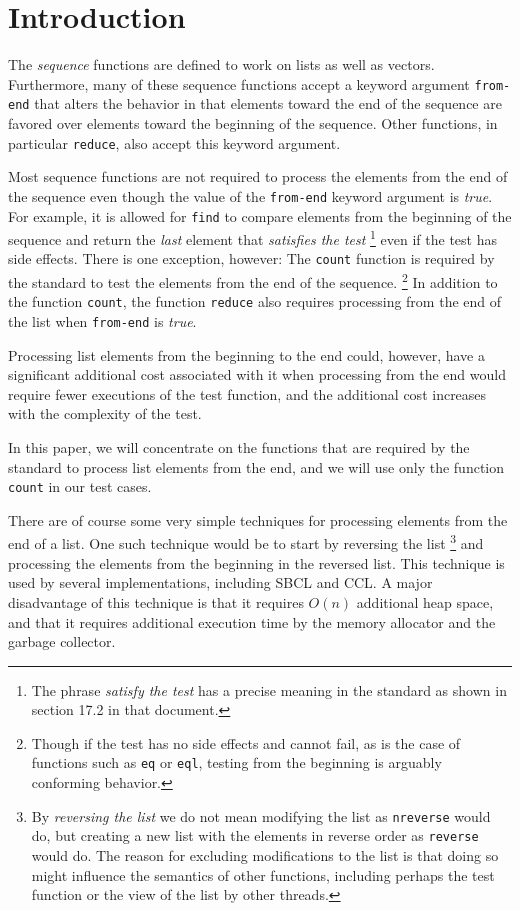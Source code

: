 \section{Introduction}

The \commonlisp{} \emph{sequence} functions are defined to work on
lists as well as vectors.  Furthermore, many of these sequence
functions accept a keyword argument \texttt{from-end} that alters the
behavior in that elements toward the end of the sequence are favored
over elements toward the beginning of the sequence.  Other functions,
in particular \texttt{reduce}, also accept this keyword argument.

Most sequence functions are not required to process the elements from
the end of the sequence even though the value of the \texttt{from-end}
keyword argument is \emph{true}.  For example, it is allowed for
\texttt{find} to compare elements from the beginning of the sequence
and return the \emph{last} element that \emph{satisfies the test}%
\footnote{The phrase \emph{satisfy the test} has a precise meaning in
  the \commonlisp{} standard as shown in section 17.2 in that
  document.}  even if the test has side effects.  There is one
exception, however: The \texttt{count} function is required by the
standard to test the elements from the end of the sequence.%
\footnote{Though if the test has no side effects and cannot fail, as
  is the case of functions such as \texttt{eq} or \texttt{eql},
  testing from the beginning is arguably conforming behavior.}
In addition to the function \texttt{count}, the function
\texttt{reduce} also requires processing from the end of the list when
\texttt{from-end} is \emph{true}.

Processing list elements from the beginning to the end could, however,
have a significant additional cost associated with it when processing
from the end would require fewer executions of the test function, and
the additional cost increases with the complexity of the test.

In this paper, we will concentrate on the functions that are required
by the standard to process list elements from the end, and we will use
only the function \texttt{count} in our test cases.

There are of course some very simple techniques for processing elements
from the end of a list.
One such technique would be to start by reversing the list%
\footnote{By \emph{reversing the list} we do not mean modifying the
  list as \texttt{nreverse} would do, but creating a new list with the
  elements in reverse order as \texttt{reverse} would do.  The reason
  for excluding modifications to the list is that doing so might
  influence the semantics of other functions, including perhaps the
  test function or the view of the list by other threads.}  and
processing the elements from the beginning in the reversed list.  This
technique is used by several implementations, including SBCL and CCL.
A major disadvantage of this technique is that it requires $O(n)$
additional heap space, and that it requires additional execution time
by the memory allocator and the garbage collector.


